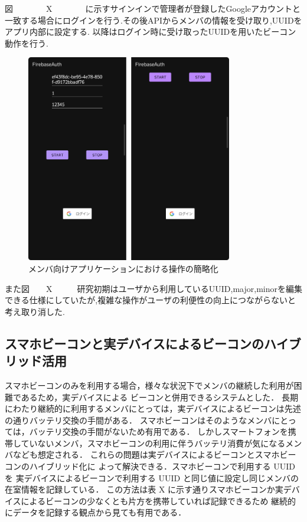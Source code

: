 図　　　　X　　　　に示すサインインで管理者が登録したGoogleアカウントと一致する場合にログインを行う.その後APIからメンバの情報を受け取り,UUIDをアプリ内部に設定する.
以降はログイン時に受け取ったUUIDを用いたビーコン動作を行う.


\begin{figure}[tbh]
  \centering
  \includegraphics[width=9cm]{image/AppBeforeAfter.png}
  \caption{メンバ向けアプリケーションにおける操作の簡略化}
  \label{multipleBPM}
\end{figure}
また図　　X　　　研究初期はユーザから利用しているUUID,major,minorを編集できる仕様にしていたが,複雑な操作がユーザの利便性の向上につながらないと考え取り消した.


\subsection{スマホビーコンと実デバイスによるビーコンのハイブリッド活用}
スマホビーコンのみを利用する場合，様々な状況下でメンバの継続した利用が困難であるため，実デバイスによる
ビーコンと併用できるシステムとした．
長期にわたり継続的に利用するメンバにとっては，実デバイスによるビーコンは先述の通りバッテリ交換の手間がある．
スマホビーコンはそのようなメンバにとっては，バッテリ交換の手間がないため有用である．
しかしスマートフォンを携帯していないメンバ，スマホビーコンの利用に伴うバッテリ消費が気になるメンバなども想定される．
これらの問題は実デバイスによるビーコンとスマホビーコンのハイブリッド化に
よって解決できる．スマホビーコンで利用する UUID を
実デバイスによるビーコンで利用する UUID と同じ値に設定し同じメンバの在室情報を記録している．
この方法は表      X        に示す通りスマホビーコンか実デバイスによるビーコンの少なくとも片方を携帯していれば記録できるため
継続的にデータを記録する観点から見ても有用である．


